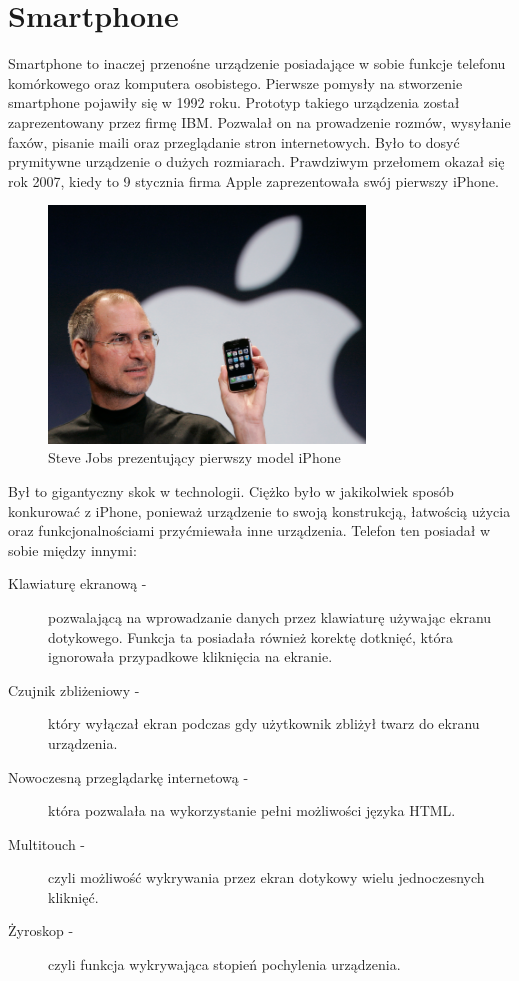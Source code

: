 \documentclass[a4paper,12pt,oneside]{book}
\begin{document}
	\section{Smartphone}
	Smartphone to inaczej przenośne urządzenie posiadające w sobie funkcje telefonu komórkowego oraz komputera osobistego. Pierwsze pomysły na stworzenie smartphone pojawiły się w 1992 roku. Prototyp takiego urządzenia został zaprezentowany przez firmę IBM. Pozwalał on na prowadzenie rozmów, wysyłanie faxów, pisanie maili oraz przeglądanie stron internetowych. Było to dosyć prymitywne urządzenie o dużych rozmiarach. Prawdziwym przełomem okazał się rok 2007, kiedy to 9 stycznia firma Apple zaprezentowała swój pierwszy iPhone.
	
	\begin{figure}[h]
		\centering
		\includegraphics[width=0.75\textwidth]{grafika/steve_jobs_iphone_presentation.png}
		\caption{Steve Jobs prezentujący pierwszy model iPhone}
	\end{figure}
	
	Był to gigantyczny skok w technologii. Ciężko było w jakikolwiek sposób konkurować z iPhone, ponieważ urządzenie to swoją konstrukcją, łatwością użycia oraz funkcjonalnościami przyćmiewała inne urządzenia. Telefon ten posiadał w sobie między innymi:
	
	\begin{description}
		\item[Klawiaturę ekranową -] pozwalającą na wprowadzanie danych przez klawiaturę używając ekranu dotykowego. Funkcja ta posiadała również korektę dotknięć, która ignorowała przypadkowe kliknięcia na ekranie.
		\item[Czujnik zbliżeniowy -] który wyłączał ekran podczas gdy użytkownik zbliżył twarz do ekranu urządzenia.
		\item[Nowoczesną przeglądarkę internetową -] która pozwalała na wykorzystanie pełni możliwości języka HTML.
		\item[Multitouch -] czyli możliwość wykrywania przez ekran dotykowy wielu jednoczesnych kliknięć.
		\item[Żyroskop -] czyli funkcja wykrywająca stopień pochylenia urządzenia. 
	\end{description}
\end{document}
